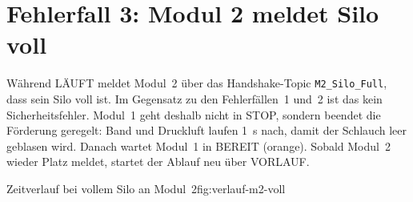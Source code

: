 \clearpage
\section{Fehlerfall 3: Modul 2 meldet Silo voll}
\label{sec:verlauf-m2-voll}

Während LÄUFT meldet Modul~2 über das Handshake-Topic \texttt{M2\_Silo\_Full},
dass sein Silo voll ist. Im Gegensatz zu den Fehlerfällen~1 und~2 ist das kein
Sicherheitsfehler. Modul~1 geht deshalb nicht in STOP, sondern beendet die
Förderung geregelt: Band und Druckluft laufen 1~s nach, damit der Schlauch leer
geblasen wird. Danach wartet Modul~1 in BEREIT (orange). Sobald Modul~2 wieder
Platz meldet, startet der Ablauf neu über VORLAUF.

\begin{zeitdiagramm}{Zeitverlauf bei vollem Silo an Modul~2}{fig:verlauf-m2-voll}
\end{zeitdiagramm}

